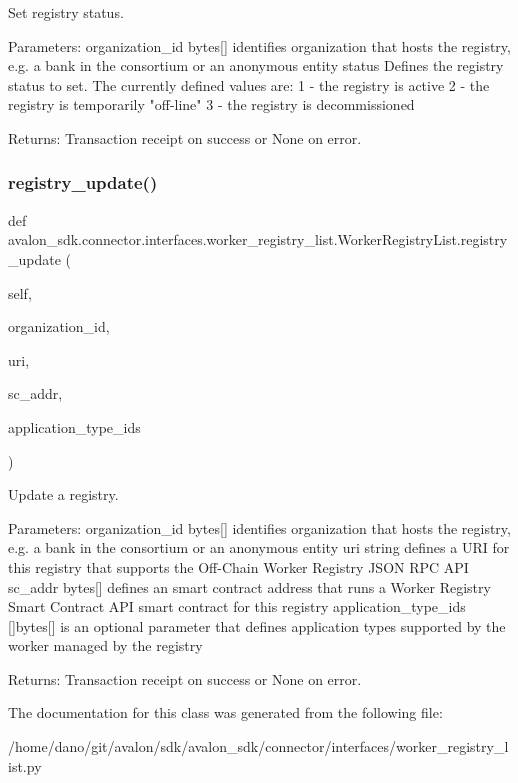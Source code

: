 \begin{DoxyVerb}Set registry status.

Parameters:
organization_id bytes[] identifies organization that hosts the
        registry, e.g. a bank in the consortium or an
        anonymous entity
status          Defines the registry status to set.
        The currently defined values are:
        1 - the registry is active
        2 - the registry is temporarily "off-line"
        3 - the registry is decommissioned

Returns:
Transaction receipt on success or None on error.
\end{DoxyVerb}
 \mbox{\label{classavalon__sdk_1_1connector_1_1interfaces_1_1worker__registry__list_1_1WorkerRegistryList_a253090eed6a5578e6fb5d0aee6b57828}} 
\subsubsection{\texorpdfstring{registry\+\_\+update()}{registry\_update()}}
{\footnotesize\ttfamily def avalon\+\_\+sdk.\+connector.\+interfaces.\+worker\+\_\+registry\+\_\+list.\+Worker\+Registry\+List.\+registry\+\_\+update (\begin{DoxyParamCaption}\item[{}]{self,  }\item[{}]{organization\+\_\+id,  }\item[{}]{uri,  }\item[{}]{sc\+\_\+addr,  }\item[{}]{application\+\_\+type\+\_\+ids }\end{DoxyParamCaption})}

\begin{DoxyVerb}Update a registry.

Parameters:
organization_id      bytes[] identifies organization that hosts the
             registry, e.g. a bank in the consortium or an
             anonymous entity
uri                  string defines a URI for this registry that
             supports the Off-Chain Worker Registry
             JSON RPC API
sc_addr              bytes[] defines an smart contract address that
             runs a Worker Registry Smart Contract API
             smart contract for this registry
application_type_ids []bytes[] is an optional parameter that defines
             application types supported by the worker
             managed by the registry

Returns:
Transaction receipt on success or None on error.
\end{DoxyVerb}
 

The documentation for this class was generated from the following file\+:\begin{DoxyCompactItemize}
\item 
/home/dano/git/avalon/sdk/avalon\+\_\+sdk/connector/interfaces/worker\+\_\+registry\+\_\+list.\+py\end{DoxyCompactItemize}
